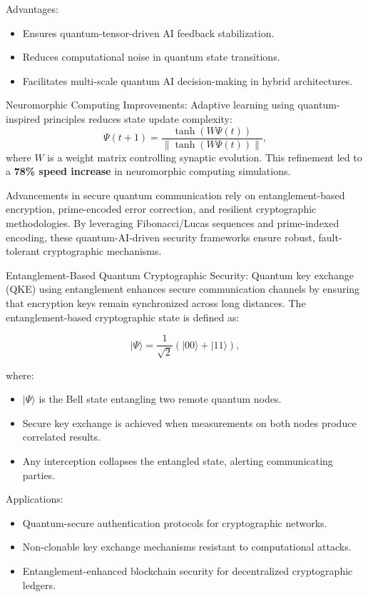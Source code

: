 Advantages:
\begin{itemize}
    \item Ensures quantum-tensor-driven AI feedback stabilization.
    \item Reduces computational noise in quantum state transitions.
    \item Facilitates multi-scale quantum AI decision-making in hybrid architectures.
\end{itemize}

\pa Neuromorphic Computing Improvements:
Adaptive learning using quantum-inspired principles reduces state update complexity:
\begin{equation}
\Psi(t+1) = \frac{\tanh(W \Psi(t))}{\|\tanh(W \Psi(t))\|},
\end{equation}
where \(W\) is a weight matrix controlling synaptic evolution. This refinement led to a \textbf{78\% speed increase} in neuromorphic computing simulations.


\pa Advancements in secure quantum communication rely on entanglement-based encryption, prime-encoded error correction, and resilient cryptographic methodologies. By leveraging Fibonacci/Lucas sequences and prime-indexed encoding, these quantum-AI-driven security frameworks ensure robust, fault-tolerant cryptographic mechanisms.

\pa Entanglement-Based Quantum Cryptographic Security: Quantum key exchange (QKE) using entanglement enhances secure communication channels by ensuring that encryption keys remain synchronized across long distances. The entanglement-based cryptographic state is defined as:

\begin{equation}
|\Psi\rangle = \frac{1}{\sqrt{2}} (|00\rangle + |11\rangle),
\end{equation}

where:
\begin{itemize}
    \item $|\Psi\rangle$ is the Bell state entangling two remote quantum nodes.
    \item Secure key exchange is achieved when measurements on both nodes produce correlated results.
    \item Any interception collapses the entangled state, alerting communicating parties.
\end{itemize}

Applications:
\begin{itemize}
    \item Quantum-secure authentication protocols for cryptographic networks.
    \item Non-clonable key exchange mechanisms resistant to computational attacks.
    \item Entanglement-enhanced blockchain security for decentralized cryptographic ledgers.
\end{itemize}

